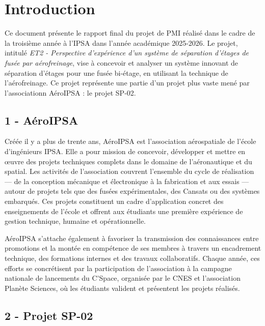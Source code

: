 \section*{Introduction}
\label{sec:introduction}

Ce document présente le rapport final du projet de \acrfull{PMI} réalisé dans le cadre de la troisième année à l'\acrshort{IPSA}
dans l'année académique 2025-2026. Le projet, intitulé \textit{ET2 - Perspective d’expérience d’un système de séparation
d’étages de fusée par aérofreinage}, vise à concevoir et analyser un système innovant de séparation d’étages pour une fusée
bi-étage, en utilisant la technique de l’aérofreinage. Ce projet représente une partie d'un projet plus vaste mené par
l'associationn AéroIPSA : le projet SP-02.

\subsection*{1 - AéroIPSA}

Créée il y a plus de trente ans, AéroIPSA est l’association aérospatiale de l’école d’ingénieurs IPSA. Elle a pour mission de
concevoir, développer et mettre en œuvre des projets techniques complets dans le domaine de l’aéronautique et du spatial. Les
activités de l’association couvrent l’ensemble du cycle de réalisation — de la conception mécanique et électronique à la
fabrication et aux essais — autour de projets tels que des fusées expérimentales, des Cansats ou des systèmes embarqués. Ces
projets constituent un cadre d’application concret des enseignements de l’école et offrent aux étudiants une première expérience
de gestion technique, humaine et opérationnelle.

AéroIPSA s’attache également à favoriser la transmission des connaissances entre promotions et la montée en compétence de ses
membres à travers un encadrement technique, des formations internes et des travaux collaboratifs. Chaque année, ces efforts se
concrétisent par la participation de l’association à la campagne nationale de lancements du \gls{C'Space}, organisée par le
\acrfull{CNES} et l'association Planète Sciences, où les étudiants valident et présentent les projets réalisés.

\subsection*{2 - Projet SP-02}


